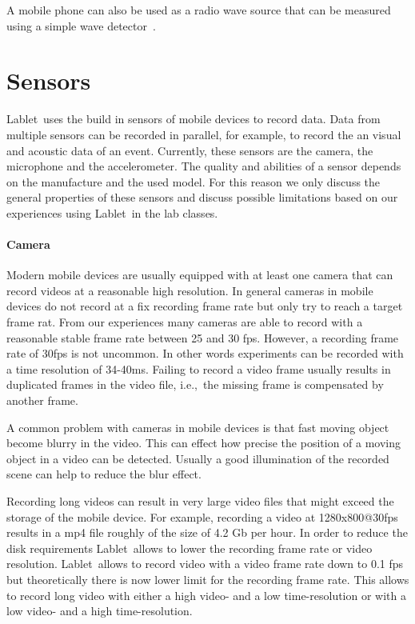 \documentclass{sigchi}
\newcommand{\ie}{i.e.,\ }
\newcommand{\lablet}{Lablet\ }
\begin{document}
A mobile phone can also be used as a radio wave source that can be measured using a simple wave detector~\cite{Hare2010}.


\section{Sensors}
\lablet uses the build in sensors of mobile devices to record data.
Data from multiple sensors can be recorded in parallel, for example, to record the an visual and acoustic data of an event.
Currently, these sensors are the camera, the microphone and the accelerometer.
The quality and abilities of a sensor depends on the manufacture and the used model.
For this reason we only discuss the general properties of these sensors and discuss possible limitations based on our experiences using \lablet in the lab classes.

\paragraph{Camera}
Modern mobile devices are usually equipped with at least one camera that can record videos at a reasonable high resolution.
In general cameras in mobile devices do not record at a fix recording frame rate but only try to reach a target frame rat.
From our experiences many cameras are able to record with a reasonable stable frame rate between 25 and 30 fps.
However, a recording frame rate of 30fps is not uncommon.
In other words experiments can be recorded with a time resolution of 34-40ms.
Failing to record a video frame usually results in duplicated frames in the video file, \ie the missing frame is compensated by another frame.

A common problem with cameras in mobile devices is that fast moving object become blurry in the video.
This can effect how precise the position of a moving object in a video can be detected.
Usually a good illumination of the recorded scene can help to reduce the blur effect.

Recording long videos can result in very large video files that might exceed the storage of the mobile device.
For example, recording a video at 1280x800@30fps results in a mp4 file roughly of the size of 4.2 Gb per hour.
In order to reduce the disk requirements \lablet allows to lower the recording frame rate or video resolution.
\lablet allows to record video with a video frame rate down to 0.1 fps but theoretically there is now lower limit for the recording frame rate.
This allows to record long video with either a high video- and a low time-resolution or with a low video- and a high time-resolution.
\end{document}
